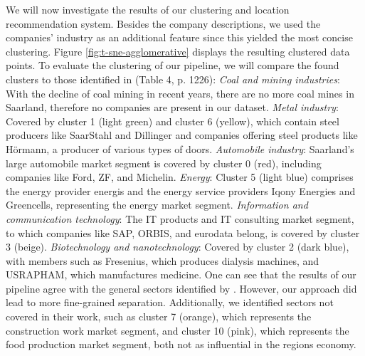 \documentclass[12pt]{article}
\begin{document}
   We will now investigate the results of our clustering and location recommendation system. Besides the company descriptions, we used the companies' industry as an additional feature since this yielded the most concise clustering. Figure \ref{fig:t-sne-agglomerative} displays the resulting clustered data points.
   To evaluate  the clustering of our pipeline, we will compare the found clusters to those identified in \cite{saarlandeco2} (Table 4, p. 1226):
   \textit{Coal and mining industries}: With the decline of coal mining in recent years, there are no more coal mines in Saarland, therefore no companies are present in our dataset.    
   \textit{Metal industry}: Covered by cluster 1 (light green) and cluster 6 (yellow), which contain steel producers like SaarStahl and Dillinger and companies offering steel products like Hörmann, a producer of various types of doors.    
   \textit{Automobile industry}: Saarland's large automobile market segment is covered by cluster 0 (red), including companies like Ford, ZF, and Michelin.    
   \textit{Energy}: Cluster 5 (light blue) comprises the energy provider energis and the energy service providers Iqony Energies and Greencells, representing the energy market segment.    
   \textit{Information and communication technology}: The IT products and IT consulting market segment, to which companies like SAP, ORBIS, and eurodata belong, is covered by cluster 3 (beige).    
   \textit{Biotechnology and nanotechnology}: Covered by cluster 2 (dark blue), with members such as Fresenius, which produces dialysis machines, and USRAPHAM, which manufactures medicine.        
   One can see that the results of our pipeline agree with the general sectors identified by \cite{saarlandeco2}. However, our approach did lead to more fine-grained separation. Additionally, we identified sectors not covered in their work, such as cluster 7 (orange), which represents the construction work market segment, and cluster 10 (pink), which represents the food production market segment, both not as influential in the regions economy.
   
\end{document}
